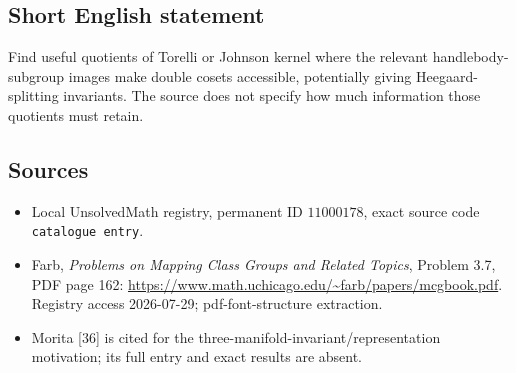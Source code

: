 \documentclass[11pt]{article}
\begin{document}
\subsection{Short English statement}
Find useful quotients of Torelli or Johnson kernel where the relevant handlebody-subgroup images make double cosets accessible, potentially giving Heegaard-splitting invariants. The source does not specify how much information those quotients must retain.
\subsection{Sources}
\begin{itemize}
\item Local UnsolvedMath registry, permanent ID \(11000178\), exact source code \texttt{catalogue entry}.
\item Farb, \emph{Problems on Mapping Class Groups and Related Topics}, Problem 3.7, PDF page 162: \url{https://www.math.uchicago.edu/~farb/papers/mcgbook.pdf}. Registry access 2026-07-29; pdf-font-structure extraction.
\item Morita [36] is cited for the three-manifold-invariant/representation motivation; its full entry and exact results are absent.
\end{itemize}
\end{document}
